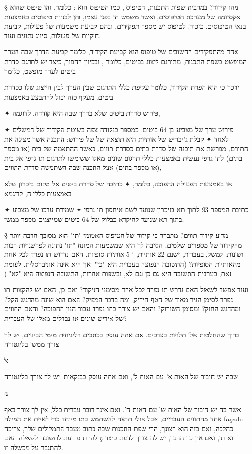 § מהו קידוד?
במרבית שפות התכנות, הטיפוס , כמו הטיפוס  הוא
: כלומר, זהו טיפוס שהוא אקסיומה של מערכת הטיפוסים, ואשר משמש
הן בפני עצמו, והן לבניית טיפוסים באמצעות בנאי הטיפוסים. כזכור, לטיפוס יש מספר
תפקידים, ובהם קביעת משמעות של פעולות, קביעת חוקיות של פעולות, סיווג נתונים
ועוד.

אחד מהתפקידים החשובים של טיפוס הוא קביעת הקידוד, כלומר קביעת הדרך שבה הערך
המופשט בשפת התכנות, מתורגם ליצוג בביטים, כלומר , ובכיוון ההפוך,
כיצד יש לתרגם סדרת ביטים לערך מופשט, כלומר .

יוזכר כי  הוא הפרת הקידוד, כלומר עקיפת כללי התרגום שבין הערך
לבין הייצוג שלו כסדרת ביטים. מעקף כזה יכול להתבצע באמצעות \begin{itemize}
✦ פירוש סדרת ביטים שלא בדרך שבה היא קודדה, לדוגמה,
\begin{itemize}
✦ פירוש ערך של מצביע בן 64 ביטים, כמספר בנקודה צפה בשיטת הקידוד של המשלים לאחד
✦ קבלת ג'יבריש של אותיות היא תוצאה של  של פירוש: התכנה אשר מציגה את התווים, מפרשת את תוכנה של סדרת בתים כסדרת תווים, כאשר ההתאמה של בית (או מספר בתים) לתו גרפי נעשית באמצעות כללי תרגום שונים מאלו ששימשו לתרגום תו גרפי אל בית (או מספר בתים) אצל התכנה שבה השתמשה סדרת התווים,
\end{itemize}
או באמצעות הפעולה ההפוכה, כלומר,
✦ כתיבה של סדרת ביטים אל מקום בזכרון שלא באמצעות כללי ה, לדוגמא
\begin{itemize}
✦ כתיבת המספר 93 לתוך תא בזיכרון שנועד לשם איחסון תו גרפי
✦ שמירת ערכו של מצביע בתוך תא שנועד להיקרא כבלוק של 64 ביטים שמייצגים מספר ממשי.
\end{itemize}
\end{itemize}

§ מדוע קידוד תווים?
מתברר כי קידוד של הטיפוס האטומי "תו" הוא מסובך הרבה יותר מהקידוד של מספרים שלמים. הסיבה לך היא שמשמעות המונח "תו" נתונה לפרשנויות רבות ושונות. למשל, בעברית, ישנם 22 אותיות, ו-5 אותיות סופיות. האם נדרוש תו נפרד לכל אחת מהאותיות הסופיות? (התשובה הנפוצה בעברית היא "כן", אך היא אינה אוניברסלית. לעומת זאת, בערבית התשובה היא גם כן וגם לא, ובשפות אחרות, התשובה הנפוצה היא "לא".)

ועוד אפשר לשאול האם נדרש תו נפרד לכל אחד מסימני הניקוד? ואם כן, האם יש להקצות תו נפרד לסימן הניר מאוד של חטף חיריק, ומה בדבר המפיק? האם הוא שונה מהדגש הקל? ומהדגש החזק? ומסימן השורוק? והאם יש צורך בתו נפרד עבור הנון ההפוכה? והאם התווים של אידיש שונים או נבדלים מאלו של העברית?

ברוך שהחלטות אלו תלויות בצרכים. אם אתה עוסק בכתבים רליגיוזית מימי הביניים, יש לך צורך ממשי בליגטורה
\begin{center}
\Huge{ﭏ}
\normalsize{}
\end{center}
שבה יש חיבור של האות א' עם האות ל', ואם אתה עוסק בבנקאות, יש לך צורך בליגטורה
\begin{center}
\Huge{₪}
\normalsize{}
\end{center}
אשר בה יש חיבור של האות ש' עם האות ח'. ואם אינך דובר עברית כלל, אין לך צורך באף אחד מהתווים העבריים, אבל אולי תרצה להשתמש בתו מיוחד כדי לאיית את המילה façade כהלכה, ואם כזה הוא רצונך, הרי שפת התכנות שבה כתוב מעבד התמלילים שלך, צריכה להיות מודעת לתשובה לשאלה האם ç הוא תו, ואם אין כך הדבר, יש לה צורך לדעת כיצד להתגבר על מכשלה זו.

